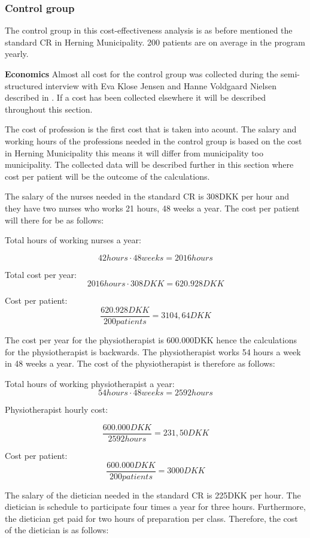 \subsubsection{Control group}

The control group in this cost-effectiveness analysis is as before mentioned the standard CR in Herning Municipality. 200 patients are on average in the program yearly. 

\textbf{Economics} \newline
Almost all cost for the control group was collected during the semi-structured interview with Eva Klose Jensen and Hanne Voldgaard Nielsen described in . If a cost has been collected elsewhere it will be described throughout this section. 

The cost of profession is the first cost that is taken into acount.
The salary and working hours of the professions needed in the control group is based on the cost in Herning Municipality this means it will differ from municipality too municipality. The collected data will be described further in this section where cost per patient will be the outcome of the calculations. 


The salary of the nurses needed in the standard CR is 308DKK per hour and they have two nurses who works 21 hours, 48 weeks a year. The cost per patient will there for be as follows:

Total hours of working nurses a year:

$$42hours\cdot48weeks=2016hours$$

Total cost per year:
$$2016hours\cdot308DKK=620.928DKK$$

Cost per patient:
$$\frac{620.928DKK}{200patients}=3104,64DKK$$

The cost per year for the physiotherapist is 600.000DKK hence the calculations for the physiotherapist is backwards. The physiotherapist works 54 hours a week in 48 weeks a year. The cost of the physiotherapist is therefore as follows:

Total hours of working physiotherapist a year:
$$54hours\cdot48weeks=2592hours$$

Physiotherapist hourly cost:

$$\frac{600.000DKK}{2592hours}=231,50DKK$$

Cost per patient:
$$\frac{600.000DKK}{200patients}=3000DKK$$

The salary of the dietician needed in the standard CR is 225DKK per hour. The dietician is schedule to participate four times a year for three hours. Furthermore, the dietician get paid for two hours of preparation per class. Therefore, the cost of the dietician is as follows:

